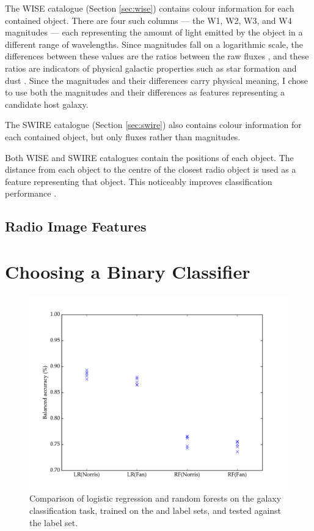     The WISE catalogue (Section \ref{sec:wise}) contains colour information for each contained object. There are four such columns --- the W1, W2, W3, and W4 magnitudes --- each representing the amount of light emitted by the object in a different range of wavelengths. Since magnitudes fall on a logarithmic scale, the differences between these values are the ratios between the raw fluxes , and these ratios are indicators of physical galactic properties such as star formation and dust . Since the magnitudes and their differences carry physical meaning, I chose to use both the magnitudes and their differences as features representing a candidate host galaxy.

    The SWIRE catalogue (Section \ref{sec:swire}) also contains colour information for each contained object, but only fluxes rather than magnitudes. 

    Both WISE and SWIRE catalogues contain the positions of each object. The distance from each object to the centre of the closest radio object is used as a feature representing that object. This noticeably improves classification performance .

  \subsection{Radio Image Features}

\section{Choosing a Binary Classifier}
\label{sec:binary-classifier}
  
  \begin{figure}[!ht]
    \centering
    \includegraphics[width=\textwidth]{images/experiments/lr_rf}
    \caption{Comparison of logistic regression and random forests on the galaxy classification task, trained on the \citet{norris06} and \citet{fan15} label sets, and tested against the \citet{norris06} label set.}
  \end{figure}

